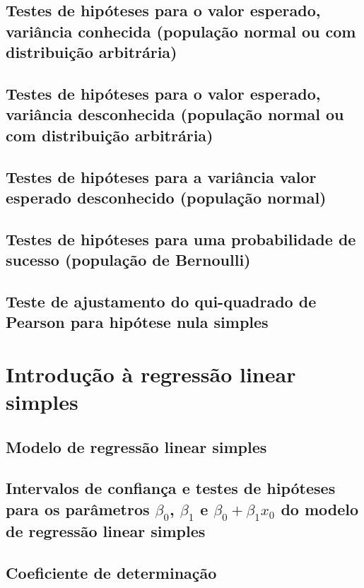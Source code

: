 \documentclass[11pt, a4paper]{article}
\begin{document}
\subsection{Testes de hipóteses para o valor esperado, variância conhecida (população normal ou com distribuição arbitrária)}

\subsection{Testes de hipóteses para o valor esperado, variância desconhecida (população normal ou com distribuição arbitrária)}

\subsection{Testes de hipóteses para a variância valor esperado desconhecido (população normal)}

\subsection{Testes de hipóteses para uma probabilidade de sucesso (população de Bernoulli)}

\subsection{Teste de ajustamento do qui-quadrado de Pearson para hipótese nula simples}


\newpage
\section{Introdução à regressão linear simples}

\subsection{Modelo de regressão linear simples}

\subsection{Intervalos de confiança e testes de hipóteses para os parâmetros $\beta_0$, $\beta_1$ e $\beta_0 + \beta_1x_0$ do modelo de regressão linear simples}

\subsection{Coeficiente de determinação}
\end{document}
